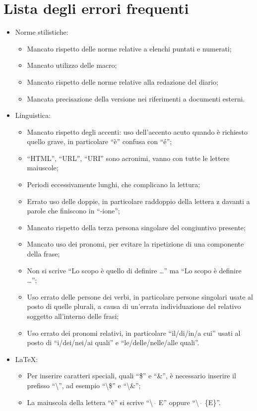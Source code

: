 \section{Lista degli errori frequenti}\label{erroriFrequenti}
\begin{itemize}
\item Norme stilistiche:
\begin{itemize}
\item Mancato rispetto delle norme relative a elenchi puntati e numerati;
\item Mancato utilizzo delle macro;
\item Mancato rispetto delle norme relative alla redazione del diario;
\item Mancata precisazione della versione nei riferimenti a documenti esterni.
\end{itemize}
\item Linguistica:
\begin{itemize}
\item Mancato rispetto degli accenti: uso dell'accento acuto quando è richiesto quello grave, in particolare ``è'' confusa con ``é'';
\item ``HTML'', ``URL'', ``URI'' sono acronimi, vanno con tutte le lettere maiuscole;
\item Periodi eccessivamente lunghi, che complicano la lettura;
\item Errato uso delle doppie, in particolare raddoppio della lettera z davanti a parole che finiscono in ``-ione'';
\item Mancato rispetto della terza persona singolare del congiuntivo presente;
\item Mancato uso dei pronomi, per evitare la ripetizione di una componente della frase;
\item Non si scrive ``Lo scopo è quello di definire \dots'' ma ``Lo scopo è definire \dots'';
\item Uso errato delle persone dei verbi, in particolare persone singolari usate al posto di quelle plurali, a causa di un'errata individuazione del relativo soggetto all'interno delle frasi;
\item Uso errato dei pronomi relativi, in particolare ``il/di/in/a cui'' usati al posto di ``i/dei/nei/ai quali'' e ``le/delle/nelle/alle quali''.
\end{itemize}
\item \LaTeX:
\begin{itemize}
\item Per inserire caratteri speciali, quali ``\$'' e ``\&'', è necessario inserire il prefisso ``\textbackslash'', ad esempio ``\textbackslash\$'' e ``\textbackslash\&'';
\item La maiuscola della lettera ``è'' si scrive ``\textbackslash\ $\grave{}$ E'' oppure ``\textbackslash\ $\grave{}$ \{E\}''.
\end{itemize}
\end{itemize}
